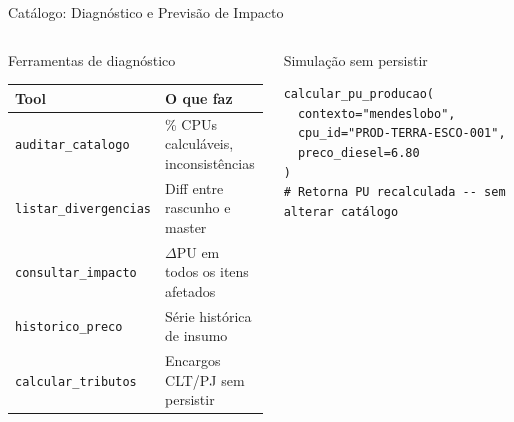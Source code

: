 \documentclass[aspectratio=169,10pt]{beamer}
\newcommand{\tool}[1]{\texttt{\footnotesize #1}}
\begin{document}
\begin{frame}{Catálogo: Diagnóstico e Previsão de Impacto}
  \begin{columns}[T]
    \begin{block}{Ferramentas de diagnóstico}
      \begin{tabularx}{\linewidth}{@{}l X@{}}
        \toprule
        \textbf{Tool} & \textbf{O que faz} \\
        \midrule
        \tool{auditar\_catalogo} & \% CPUs calculáveis, inconsistências \\
        \tool{listar\_divergencias} & Diff entre rascunho e master \\
        \tool{consultar\_impacto} & $\Delta$PU em todos os itens afetados \\
        \tool{historico\_preco} & Série histórica de insumo \\
        \tool{calcular\_tributos} & Encargos CLT/PJ sem persistir \\
        \bottomrule
      \end{tabularx}
    \end{block}
    \vspace{4pt}
    \begin{block}{Simulação sem persistir}
      \begin{lstlisting}
calcular_pu_producao(
  contexto="mendeslobo",
  cpu_id="PROD-TERRA-ESCO-001",
  preco_diesel=6.80
)
# Retorna PU recalculada -- sem alterar catálogo
      \end{lstlisting}
    \end{block}


\end{columns}
\end{frame}
\end{document}
